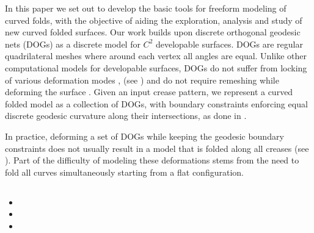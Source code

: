 In this paper we set out to develop the basic tools for freeform modeling of curved folds, with the objective of aiding the exploration, analysis and study of new curved folded surfaces. Our work builds upon discrete orthogonal geodesic nets (DOGs) \cite{rabi18,rabi2018shape} as a discrete model for $C^2$ developable surfaces. DOGs are regular quadrilateral meshes where around each vertex all angles are equal. Unlike other computational models for developable surfaces, DOGs do not suffer from locking of various deformation modes \cite{locking1,locking2,grin_shells},  \cite{pottmann_new,curved_folding_kilian,stein_dev,solomon} (see ) and do not require remeshing while deforming the surface \cite{StringActuated:2017,SchreckEG2017,Narain}. 
Given an input crease pattern, we represent a curved folded model as a collection of DOGs, with boundary constraints enforcing equal discrete geodesic curvature along their intersections, as done in \cite{rabi2018shape}.

In practice, deforming a set of DOGs while keeping the geodesic boundary constraints does not usually result in a model that is folded along all creases (see ). Part of the difficulty of modeling these deformations stems from the need to fold all curves simultaneously starting from a flat configuration.  

\subsection{}
\begin{itemize}[label={--}]
  \item {}
  \item {}
  \item {}
\end{itemize}

